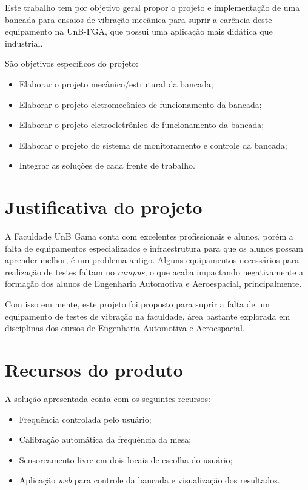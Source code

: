 \begin{apendicesenv}
    Este trabalho tem por objetivo geral propor o projeto e implementação
    de uma bancada para ensaios de vibração mecânica para suprir a carência
    deste equipamento na UnB-FGA, que possui uma aplicação mais didática
    que industrial.

   São objetivos específicos do projeto:
   \begin{itemize}
    \item Elaborar o projeto mecânico/estrutural da bancada;
    \item Elaborar o projeto eletromecânico de funcionamento da bancada;
    \item Elaborar o projeto eletroeletrônico de funcionamento da bancada;
    \item Elaborar o projeto do sistema de monitoramento e controle da bancada;
    \item Integrar as soluções de cada frente de trabalho.
   \end{itemize}
  
\section*{Justificativa do projeto}
	
    
    A Faculdade UnB Gama conta com excelentes profissionais e alunos, porém 
    a falta de equipamentos especializados e infraestrutura para que os alunos 
    possam aprender melhor, é um problema antigo. Alguns equipamentos
    necessários para realização de testes faltam no \textit{campus}, o que
    acaba impactando negativamente a formação dos alunos de Engenharia
    Automotiva e Aeroespacial, principalmente.
    
    Com isso em mente, este projeto foi proposto para suprir a falta de
    um equipamento de testes de vibração na faculdade, área bastante explorada
    em disciplinas dos cursos de Engenharia Automotiva e Aeroespacial.
    

\section*{Recursos do produto}
	
    A solução apresentada conta com os seguintes recursos:
    
    \begin{itemize}
        \item Frequência controlada pelo usuário;
    	\item Calibração automática da frequência da mesa;
        \item Sensoreamento livre em dois locais de escolha do usuário;
        \item Aplicação \textit{web} para controle da bancada e visualização
        	  dos resultados.
    \end{itemize}
    

\end{apendicesenv}
